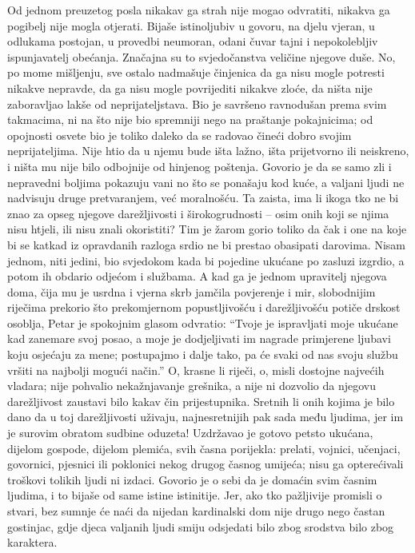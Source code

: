\documentclass[a5paper,twoside]{article}
\begin{document}
  
\pend
\pstart
Od jednom preuzetog posla nikakav ga strah nije mogao odvratiti, nikakva ga pogibelj nije mogla otjerati.  Bijaše istinoljubiv u govoru, na djelu vjeran, u odlukama postojan, u provedbi neumoran, odani čuvar tajni i nepokolebljiv ispunjavatelj obećanja. Značajna su to svjedočanstva veličine njegove duše.  No, po mome mišljenju, sve ostalo nadmašuje činjenica da ga nisu mogle potresti nikakve nepravde, da ga nisu mogle povrijediti nikakve zloće, da ništa nije zaboravljao lakše od neprijateljstava.  Bio je savršeno ravnodušan prema svim takmacima, ni na što nije bio spremniji nego na praštanje pokajnicima; od opojnosti osvete bio je toliko daleko da se radovao čineći dobro svojim neprijateljima.  
\pend
\pstart
Nije htio da u njemu bude išta lažno, išta prijetvorno ili neiskreno, i ništa mu nije bilo odbojnije od hinjenog poštenja.  Govorio je da se samo zli i nepravedni boljima pokazuju vani no što se ponašaju kod kuće, a valjani ljudi ne nadvisuju druge pretvaranjem, već moralnošću.  Ta zaista, ima li ikoga tko ne bi znao za opseg njegove darežljivosti i širokogrudnosti – osim onih koji se njima nisu htjeli, ili nisu znali okoristiti?  Tim je žarom gorio toliko da čak i one na koje bi se katkad iz opravdanih razloga srdio ne bi prestao obasipati darovima.  Nisam jednom, niti jedini, bio svjedokom kada bi pojedine ukućane po zasluzi izgrdio, a potom ih obdario odjećom i službama. A kad ga je jednom upravitelj njegova doma, čija mu je usrdna i vjerna skrb jamčila povjerenje i mir, %
slobodnijim riječima prekorio što prekomjernom popustljivošću i darežljivošću potiče drskost osoblja, Petar je spokojnim glasom odvratio: ``Tvoje je ispravljati moje ukućane kad zanemare svoj posao, a moje je dodjeljivati im nagrade primjerene ljubavi koju osjećaju za mene; postupajmo i dalje tako, pa će svaki od nas svoju službu vršiti na najbolji mogući način.''  O, krasne li riječi, o, misli dostojne najvećih vladara; nije pohvalio nekažnjavanje grešnika, a nije ni dozvolio da njegovu darežljivost zaustavi bilo kakav čin prijestupnika.  Sretnih li onih kojima je bilo dano da u toj darežljivosti uživaju, najnesretnijih pak sada među ljudima, jer im je surovim obratom sudbine oduzeta!  
\pend
\pstart
Uzdržavao je gotovo petsto ukućana, dijelom gospode, dijelom plemića, svih časna porijekla: prelati, vojnici, učenjaci, govornici, pjesnici ili poklonici nekog drugog časnog umijeća; nisu ga opterećivali troškovi tolikih ljudi ni izdaci. Govorio je o sebi da je domaćin svim časnim ljudima, i to bijaše od same istine istinitije.  Jer, ako tko pažljivije promisli o stvari, bez sumnje će naći da nijedan kardinalski dom nije drugo nego častan gostinjac, gdje djeca valjanih ljudi smiju odsjedati bilo zbog srodstva bilo zbog karaktera.
\end{document}
